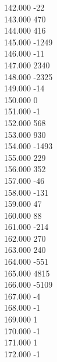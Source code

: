 { 142.000	-22 \\
 143.000	470 \\
 144.000	416 \\
 145.000	-1249 \\
 146.000	-11 \\
 147.000	2340 \\
 148.000	-2325 \\
 149.000	-14 \\
 150.000	0 \\
 151.000	-1 \\
 152.000	568 \\
 153.000	930 \\
 154.000	-1493 \\
 155.000	229 \\
 156.000	352 \\
 157.000	-46 \\
 158.000	-131 \\
 159.000	47 \\
 160.000	88 \\
 161.000	-214 \\
 162.000	270 \\
 163.000	240 \\
 164.000	-551 \\
 165.000	4815 \\
 166.000	-5109 \\
 167.000	-4 \\
 168.000	-1 \\
 169.000	1 \\
 170.000	-1 \\
 171.000	1 \\
 172.000	-1 \\
}
